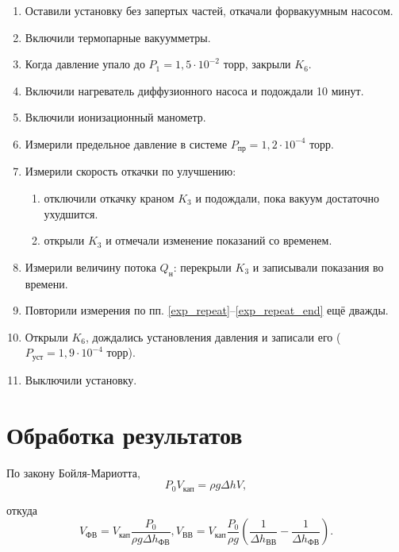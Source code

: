 \documentclass[12pt]{article}
\begin{document}
	\begin{enumerate}
		\item Оставили установку без запертых частей, откачали форвакуумным насосом.
		\item Включили термопарные вакуумметры.
		\item Когда давление упало до $P_1=1{,}5\cdot 10^{-2}$ торр, закрыли $K_6$.
		\item Включили нагреватель диффузионного насоса и подождали 10 минут.
		\item Включили ионизационный манометр.
		\item Измерили предельное давление в системе $P_\text{пр}=1{,}2\cdot 10^{-4}$ торр.
		\item Измерили скорость откачки по улучшению: \label{exp_repeat}
		\begin{enumerate}
			\item отключили откачку краном $K_3$ и подождали, пока вакуум достаточно ухудшится.
			\item открыли $K_3$ и отмечали изменение показаний со временем.
		\end{enumerate}
		\item Измерили величину потока $Q_\text{н}$: перекрыли $K_3$ и записывали показания во времени. \label{exp_repeat_end}
		\item Повторили измерения по пп. \ref{exp_repeat}--\ref{exp_repeat_end} ещё дважды.
		\item Открыли $K_6$, дождались установления давления и записали его ($P_\text{уст}=1{,}9\cdot 10^{-4}$ торр).
		\item Выключили установку.
	\end{enumerate}
	
	\section*{Обработка результатов}
	
	По закону Бойля-Мариотта,
	\begin{equation}
		\label{eq:boile-mariotte}
		P_0 V_\text{кап}= \rho g \Delta h V,
	\end{equation}
	
	откуда
	\begin{equation}
		\label{eq:vol_working}
		V_\text{ФВ}= V_\text{кап} \frac{P_0}{\rho g \Delta h_\text{ФВ}}, V_\text{ВВ}= V_\text{кап} \frac{P_0}{\rho g} \left( \frac{1}{\Delta h_\text{ВВ}} - \frac{1}{\Delta h_\text{ФВ}} \right).
	\end{equation}
	
\end{document}
